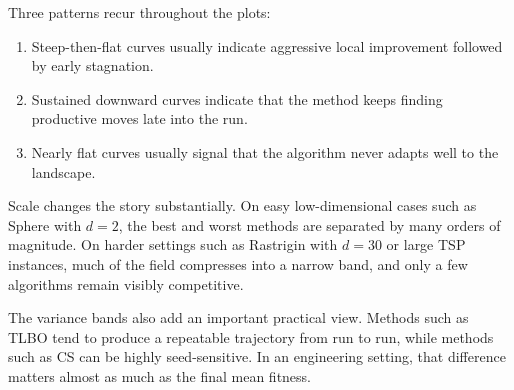 Three patterns recur throughout the plots:
\begin{enumerate}
    \item Steep-then-flat curves usually indicate aggressive local improvement followed by early stagnation.
    \item Sustained downward curves indicate that the method keeps finding productive moves late into the run.
    \item Nearly flat curves usually signal that the algorithm never adapts well to the landscape.
\end{enumerate}

Scale changes the story substantially. On easy low-dimensional cases such as Sphere with $d=2$, the best and worst methods are separated by many orders of magnitude. On harder settings such as Rastrigin with $d=30$ or large TSP instances, much of the field compresses into a narrow band, and only a few algorithms remain visibly competitive.

The variance bands also add an important practical view. Methods such as TLBO tend to produce a repeatable trajectory from run to run, while methods such as CS can be highly seed-sensitive. In an engineering setting, that difference matters almost as much as the final mean fitness.